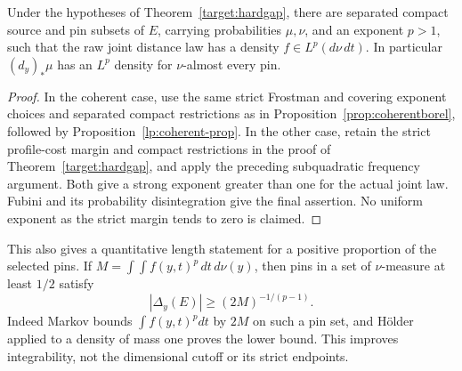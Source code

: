 \begin{theorem}
\label{lp:dimension}
Under the hypotheses of Theorem~\ref{target:hardgap}, there are separated
compact source and pin subsets of \(E\), carrying probabilities \(\mu,\nu\),
and an exponent \(p>1\), such that the raw joint distance law has a
density \(f\in L^p(d\nu\,dt)\). In particular
\((d_y)_*\mu\) has an \(L^p\) density for \(\nu\)-almost every pin.
\end{theorem}
\begin{proof}
In the coherent case, use the same strict Frostman and covering exponent
choices and separated compact restrictions as in
Proposition~\ref{prop:coherentborel}, followed by
Proposition~\ref{lp:coherent-prop}. In the other case, retain the
strict profile-cost margin and compact restrictions in the proof of
Theorem~\ref{target:hardgap}, and apply the preceding subquadratic
frequency argument. Both give a strong exponent greater than one for
the actual joint law. Fubini and its probability disintegration give
the final assertion. No uniform exponent as the strict margin tends
to zero is claimed.
\end{proof}

This also gives a quantitative length statement for a positive proportion of
the selected pins. If \(M=\int\!\int f(y,t)^p\,dt\,d\nu(y)\), then
pins in a set of \(\nu\)-measure at least \(1/2\) satisfy
\[
 |\Delta_y(E)|\ge(2M)^{-1/(p-1)}.
\]
Indeed Markov bounds \(\int f(y,t)^pdt\) by \(2M\) on such a pin
set, and H\"older applied to a density of mass one proves the lower
bound. This improves integrability, not the dimensional cutoff or its
strict endpoints.
